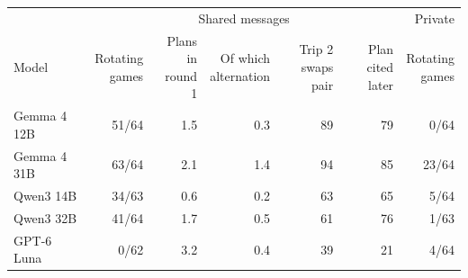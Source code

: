 \begin{tabular}{lrrrrrr}
\toprule
 & \multicolumn{5}{c}{Shared messages} & Private \\
\cmidrule(lr){2-6}\cmidrule(lr){7-7}
Model & \makecell{Rotating\\games} & \makecell{Plans in\\round 1} & \makecell{Of which\\alternation} & \makecell{Trip 2\\swaps pair} & \makecell{Plan\\cited later} & \makecell{Rotating\\games} \\
\midrule
Gemma 4 12B & 51/64 & 1.5 & 0.3 & 89 & 79 & 0/64 \\
Gemma 4 31B & 63/64 & 2.1 & 1.4 & 94 & 85 & 23/64 \\
Qwen3 14B & 34/63 & 0.6 & 0.2 & 63 & 65 & 5/64 \\
Qwen3 32B & 41/64 & 1.7 & 0.5 & 61 & 76 & 1/63 \\
GPT-6 Luna & 0/62 & 3.2 & 0.4 & 39 & 21 & 4/64 \\
\bottomrule
\end{tabular}
